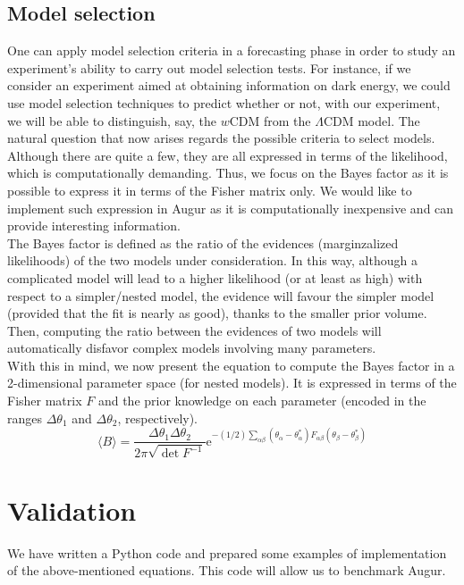 \documentclass[modern]{lsstdescnote}
\begin{document}
\subsection{Model selection}
One can apply model selection criteria in a forecasting phase in order to study an experiment's ability to carry out model selection tests.
For instance, if we consider an experiment aimed at obtaining information on dark energy, we could use model selection techniques to predict whether or not,
with our experiment, we will be able to distinguish, say, the $w$CDM from the $\Lambda$CDM model.
The natural question that now arises regards the possible criteria to select models. Although there are quite a few, they are all expressed in terms of the likelihood,
which is computationally demanding. Thus, we focus on the Bayes factor as it is possible to express it in terms of the Fisher matrix only. We would like to implement
such expression in Augur as it is computationally inexpensive and can provide interesting information.\\
The Bayes factor is defined as the ratio of the evidences (marginzalized likelihoods) of the two models under consideration.
In this way, although a complicated model will lead to a higher likelihood (or at least as high) with respect to a simpler/nested model, the evidence will favour
the simpler model (provided that the fit is nearly as good), thanks to the smaller prior volume. 
Then, computing the ratio between the evidences of two models will automatically disfavor complex models involving many parameters.\\
With this in mind, we now present the equation to compute the Bayes factor in a 2-dimensional parameter space (for nested models). It is expressed in terms of the Fisher matrix $F$ and the prior knowledge
on each parameter (encoded in the ranges $\Delta \theta_{1}$ and $\Delta \theta_{2}$, respectively). 
\begin{equation}
  \langle B\rangle=\frac{\Delta \theta_{1} \Delta \theta_{2}}{2 \pi \sqrt{\operatorname{det} F^{-1}}} \mathrm{e}^{-(1 / 2) \sum_{\alpha \beta}\left(\theta_{\alpha}-\theta_{\alpha}^{*}\right) F_{\alpha \beta}\left(\theta_{\beta}-\theta_{\beta}^{*}\right)}
  \end{equation}
\section{Validation}
We have written a Python code and prepared some examples of implementation of the above-mentioned equations. This code will allow
us to benchmark Augur. 
\end{document}
